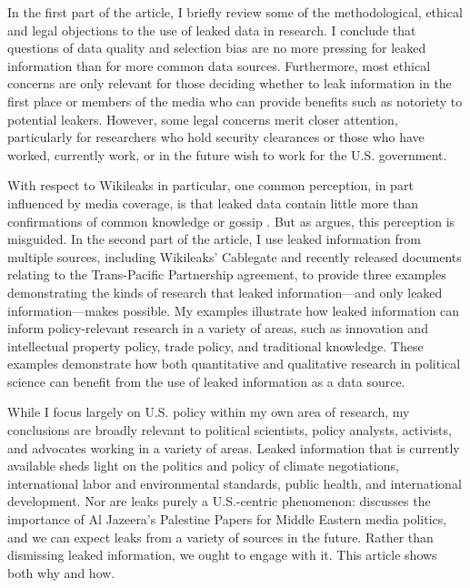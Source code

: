 \documentclass[12pt]{article}
\begin{document}
In the first part of the article, I briefly review some of the methodological, ethical and legal objections to the use of leaked data 
in research. I conclude that 
questions of data quality and selection bias are no more pressing for leaked information 
than for more common data sources. Furthermore, most ethical concerns are only relevant for those deciding 
whether to leak information in the first place or members of the media who can provide benefits 
such as notoriety to potential leakers. However, some legal concerns merit closer attention, particularly for researchers 
who hold security clearances or those who have worked, currently work, or in the future wish to work for the U.S. government.

With respect to Wikileaks in particular, one common perception, in part influenced by media 
coverage, is that leaked data contain little more than confirmations of common knowledge or 
gossip \citep{saunders2011wikileaks,chesterman2011wikileaks}. But as \citet{bob2010wikileaks} argues, this perception is 
misguided. In the second part of the article, I use leaked information from multiple sources, including Wikileaks' 
Cablegate and recently 
released documents relating to the Trans-Pacific Partnership agreement, to provide three examples 
demonstrating the kinds of research that leaked information---and only leaked information---makes possible. 
My examples illustrate how leaked information can inform policy-relevant research in a variety of areas, such as 
innovation and intellectual property policy, trade policy, and traditional knowledge.
These examples demonstrate 
how both quantitative and qualitative research in political science can benefit from the use of 
leaked information as a data source. 

While I focus largely on U.S. policy within my own area of research, my conclusions are broadly relevant 
to political scientists, policy analysts, activists, and advocates working in a variety of areas. 
Leaked information that is currently available sheds light on the politics and policy of climate negotiations, 
international labor and environmental standards, public health, and international development. Nor are leaks 
purely a U.S.-centric phenomenon: \citet{zayani2013jazeeras} discusses the importance of Al Jazeera's 
Palestine Papers for Middle Eastern media politics, and we can expect leaks from a variety of sources in the future. 
Rather than dismissing leaked information, we ought to engage with it. This article shows both why and how.
\end{document}
